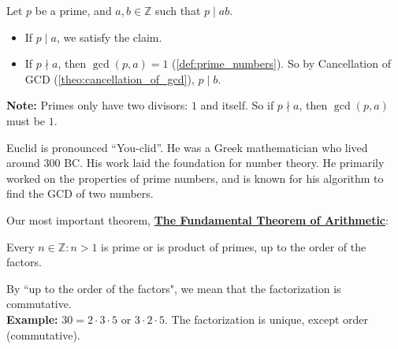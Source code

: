 \begin{Proof}

    \label{theo:euclids_lemma}

    Let $p$ be a prime, and $a,b\in\mathbb{Z}$ such that $p\mid ab$.
    \begin{itemize}
        \item If $p\mid a$, we satisfy the claim.
        \item If $p\nmid a$, then $\gcd(p,a)=1$ (\ref{def:prime_numbers}). So by Cancellation of GCD (\ref{theo:cancellation_of_gcd}), $p\mid b$.
    \end{itemize}
\end{Proof}
\begin{Note}
    \textbf{Note:} Primes only have two divisors: $1$ and itself. So if $p\nmid a$, then $\gcd(p,a)$ must be $1$.
\end{Note}
\begin{Tip}
    Euclid is pronounced ``You-clid''. He was a Greek mathematician who lived around 300 BC. His work laid the foundation for number theory.
    He primarily worked on the properties of prime numbers, and is known for his algorithm to find the GCD of two numbers.
\end{Tip}

\newpage

\noindent
Our most important theorem, \underline{\textbf{The Fundamental Theorem of Arithmetic}}:

\begin{theo}

    \label{theo:FTA}

    Every $n\in\mathbb{Z}:n>1$ is prime or is product of primes, up to the order of the factors.
\end{theo}
By ``up to the order of the factors", we mean that the factorization is commutative.\\
\textbf{Example:} $30=2\cdot3\cdot5$ or $3\cdot2\cdot5$. The factorization is unique, except order (commutative).\\

